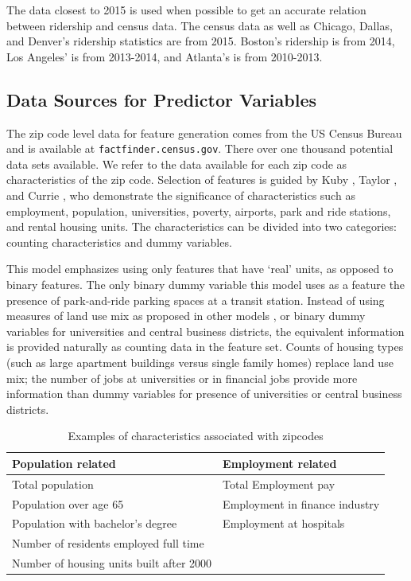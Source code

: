 \documentclass[11pt]{article}
\begin{document}
The data closest to 2015 is used when possible to get an accurate relation between ridership and census data. The census data as well as Chicago, Dallas, and Denver's ridership statistics are from 2015. Boston's ridership is from 2014, Los Angeles' is from 2013-2014, and Atlanta's is from 2010-2013. 

\subsection{Data Sources for Predictor Variables}\label{sec:data}

The zip code level data for feature generation comes from the US Census Bureau and is available at \texttt{factfinder.census.gov}. There over one thousand potential data sets available. We refer to the data available for each zip code as characteristics of the zip code. Selection of features is guided by Kuby \cite{Kuby2004}, Taylor \cite{Taylor2008}, and Currie \cite{Currie2011}, who demonstrate the significance of characteristics such as employment, population, universities, poverty, airports, park and ride stations, and rental housing units. The characteristics can be divided into two categories: counting characteristics and dummy variables. 

This model emphasizes using only features that have `real' units, as opposed to binary features. The only binary dummy variable this model uses as a feature the presence of park-and-ride parking spaces at a transit station. Instead of using measures of land use mix as proposed in other models \cite{Durning2015, Gutierrez2011}, or binary dummy variables for universities and central business districts, the equivalent information is provided naturally as counting data in the feature set. Counts of housing types (such as large apartment buildings versus single family homes) replace land use mix; the number of jobs at universities or in financial jobs provide more information than dummy variables for presence of universities or central business districts. 

\begin{table}[H]
\centering\begingroup\fontsize{10}{10}\selectfont
\begin{tabular}{ll}
\toprule \textbf{Population related}&\textbf{Employment related} \\ 
\midrule Total population&Total Employment pay\\
Population over age 65& Employment in finance industry\\
Population with bachelor's degree& Employment at hospitals\\
Number of residents employed full time&\\
Number of housing units built after 2000&\\
\bottomrule
\end{tabular}\endgroup
\caption{Examples of characteristics associated with zipcodes}\label{tab:char}
\end{table}
\end{document}
